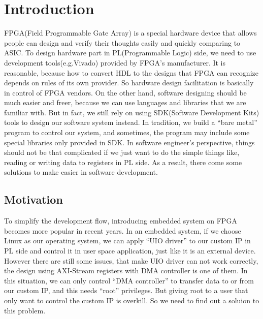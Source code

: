 \chapter{Introduction}
\label{cha:introduction}
FPGA(Field Programmable Gate Array) is a special hardware device that allows people can design and verify their thoughts easily and quickly comparing to ASIC. To design hardware part in PL(Programmable Logic) side, we need to use development tools(e.g.Vivado) provided by FPGA's manufacturer. It is reasonable, because how to convert HDL to the designs that FPGA can recognize depends on rules of its own provider. So hardware design facilitation is basically in control of FPGA vendors. On the other hand, software designing should be much easier and freer, because we can use languages and libraries that we are familiar with. But in fact, we still rely on using SDK(Software Development Kits) tools to design our software system instead. In tradition, we build a ``bare metal'' program to control our system, and sometimes, the program may include some special libraries only provided in SDK. In software engineer's perspective, things should not be that complicated if we just want to do the simple things like, reading or writing data to registers in PL side. As a result, there come some solutions to make easier in software development.  


\section{Motivation}
\label{sec:Motivation}

 To simplify the development flow, introducing embedded system on FPGA becomes more popular in recent years. In an embedded system, if we choose Linux as our operating system, we can apply ``UIO driver'' to our custom IP in PL side and control it in user space application, just like it is an external device. However there are still some issues, that make UIO driver can not work correctly, the design using AXI-Stream registers with DMA controller is one of them. In this situation, we can only control ``DMA controller'' to transfer data to or from our custom IP, and this needs ``root'' privileges. But giving root to a user that only want to control the custom IP is overkill. So we need to find out a soluion to this problem. 

